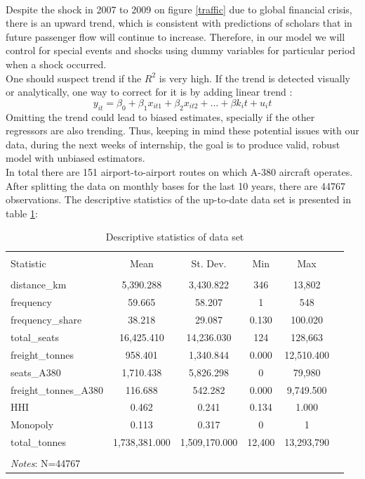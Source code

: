 \documentclass[titlepage, 11pt]{article}
\begin{document}
\\
\tab Despite the shock in 2007 to 2009 on figure \ref{traffic} due to global financial crisis, there is an upward trend, which is consistent with predictions of scholars that in future passenger flow will continue to increase. Therefore, in our model we will control for special events and shocks using dummy variables for particular period when a shock occurred.\\
\tab One should suspect trend if the $R^2$ is very high. If the trend is detected visually or analytically, one way to correct for it is by adding linear trend \cite{Hsiao}:
\begin{equation}
y_{it} = \beta_0+ \beta_1x_{it1} + \beta_2x_{it2} + ... +\beta k_it + u_it
\end{equation}
\tab Omitting the trend could lead to biased estimates, specially if the other regressors are also trending. Thus, keeping in mind these potential issues with our data, during the next weeks of internship, the goal is to produce valid, robust model with unbiased estimators.   \\
\tab In total there are 151 airport-to-airport routes on which A-380 aircraft operates. After splitting the data on monthly bases for the last 10 years, there are 44767 observations. The descriptive statistics of the up-to-date data set is presented in table \ref{descriptstat}:
\begin{table}[!htbp] \centering 
    \caption{Descriptive statistics of data set} 
  \label{} 
\begin{tabular}{@{\extracolsep{5pt}}lccccc} 
\\[-1.8ex]\hline 
\hline \\[-1.8ex] 
Statistic & \multicolumn{1}{c}{Mean} & \multicolumn{1}{c}{St. Dev.} & \multicolumn{1}{c}{Min} & \multicolumn{1}{c}{Max} \\ 
\hline \\[-1.8ex] 
distance\_km & 5,390.288 & 3,430.822 & 346 & 13,802 \\ 
frequency & 59.665 & 58.207 & 1 & 548 \\ 
frequency\_share & 38.218 & 29.087 & 0.130 & 100.020 \\ 
total\_seats & 16,425.410 & 14,236.030 & 124 & 128,663 \\ 
freight\_tonnes & 958.401 & 1,340.844 & 0.000 & 12,510.400 \\ 
seats\_A380 & 1,710.438 & 5,826.298 & 0 & 79,980 \\ 
freight\_tonnes\_A380 & 116.688 & 542.282 & 0.000 & 9,749.500 \\ 
HHI  & 0.462 & 0.241 & 0.134 & 1.000 \\ 
Monopoly & 0.113 & 0.317 & 0 & 1 \\ 
total\_tonnes & 1,738,381.000 & 1,509,170.000 & 12,400 & 13,293,790 \\ 
\hline \\[-1.8ex] 
\multicolumn{5}{p{.8\textwidth}}{\textit{Notes}: N=44767}
\end{tabular} 
\label{descriptstat}
\end{table} 
\end{document}
